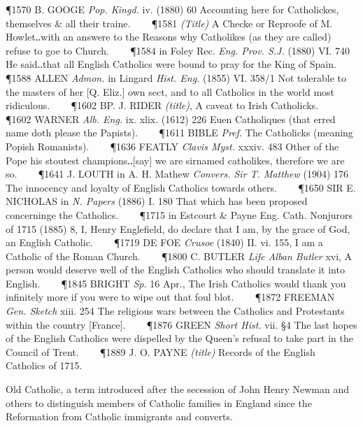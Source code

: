 \begin{description}[wide, labelwidth=!, labelindent=0pt]
\begin{myenumerate}
\P 1570 B. GOOGE  \textit{Pop. Kingd.} iv. (1880) 60 Accounting here for Catholickes, themselves \& all their traine.    
\P 1581 \textit{(Title)} A Checke or Reproofe of M. Howlet‥with an answere to the Reasons why Catholikes (as they are called) refuse to goe to Church.    
\P 1584 in Foley Rec. \textit{Eng. Prov. S.J.} (1880) VI. 740 He said‥that all English Catholics were bound to pray for the King of Spain.    
\P 1588 ALLEN  \textit{Admon.} in Lingard \textit{Hist. Eng.} (1855) VI. 358/1 Not tolerable to the masters of her [Q. Eliz.] own sect, and to all Catholics in the world most ridiculous.    
\P 1602 BP. J. RIDER  \textit{(title)}, A caveat to Irish Catholicks.    
\P 1602 WARNER  \textit{Alb. Eng.} ix. xlix. (1612) 226 Euen Catholiques (that erred name doth please the Papists).    
\P 1611 BIBLE  \textit{Pref.} The Catholicks (meaning Popish Romanists).    
\P 1636 FEATLY  \textit{Clavis Myst.} xxxiv. 483 Other of the Pope his stoutest champions‥[say] we are sirnamed catholikes, therefore we are so.    
\P 1641 J. LOUTH in A. H. Mathew \textit{Convers. Sir T. Matthew} (1904) 176 The innocency and loyalty of English Catholics towards others.    
\P 1650 SIR E. NICHOLAS  in \textit{N. Papers} (1886) I. 180 That which has been proposed concerninge the Catholics.    
\P 1715 in Estcourt \& Payne Eng. Cath. Nonjurors of 1715 (1885)  8, I, Henry Englefield, do declare that I am, by the grace of God, an English Catholic.    
\P 1719 DE FOE  \textit{Crusoe} (1840) II. vi. 155, I am a Catholic of the Roman Church.    
\P 1800 C. BUTLER  \textit{Life Alban Butler} xvi, A person would deserve well of the English Catholics who should translate it into English.    
\P 1845 BRIGHT  \textit{Sp.} 16 Apr., The Irish Catholics would thank you infinitely more if you were to wipe out that foul blot.    
\P 1872 FREEMAN  \textit{Gen. Sketch} xiii. 254 The religious wars between the Catholics and Protestants within the country [France].    
\P 1876 GREEN  \textit{Short Hist.} vii. §4 The last hopes of the English Catholics were dispelled by the Queen's refusal to take part in the Council of Trent.    
\P 1889 J. O. PAYNE  \textit{(title)} Records of the English Catholics of 1715.

 Old Catholic, a term introduced after the secession of John Henry Newman and others to distinguish members of Catholic families in England since the Reformation from Catholic immigrants and converts.


\end{myenumerate}
\end{description}
